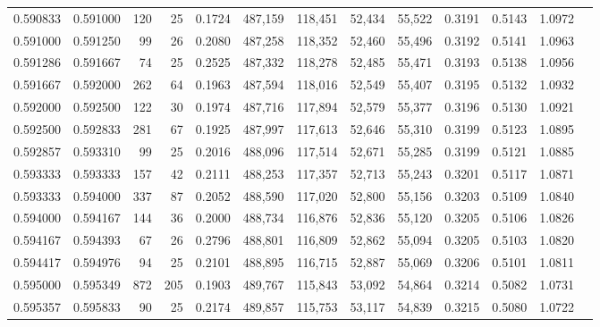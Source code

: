 \begin{tabular}{rrrrrrrrrrrrr}
0.590833 & 0.591000 &   120 &  25 &                                     0.1724 & 487,159 & 118,451 &  52,434 &  55,522 & 0.3191 & 0.5143 & 1.0972 \\
0.591000 & 0.591250 &    99 &  26 &                                     0.2080 & 487,258 & 118,352 &  52,460 &  55,496 & 0.3192 & 0.5141 & 1.0963 \\
0.591286 & 0.591667 &    74 &  25 &                                     0.2525 & 487,332 & 118,278 &  52,485 &  55,471 & 0.3193 & 0.5138 & 1.0956 \\
0.591667 & 0.592000 &   262 &  64 &                                     0.1963 & 487,594 & 118,016 &  52,549 &  55,407 & 0.3195 & 0.5132 & 1.0932 \\
0.592000 & 0.592500 &   122 &  30 &                                     0.1974 & 487,716 & 117,894 &  52,579 &  55,377 & 0.3196 & 0.5130 & 1.0921 \\
0.592500 & 0.592833 &   281 &  67 &                                     0.1925 & 487,997 & 117,613 &  52,646 &  55,310 & 0.3199 & 0.5123 & 1.0895 \\
0.592857 & 0.593310 &    99 &  25 &                                     0.2016 & 488,096 & 117,514 &  52,671 &  55,285 & 0.3199 & 0.5121 & 1.0885 \\
0.593333 & 0.593333 &   157 &  42 &                                     0.2111 & 488,253 & 117,357 &  52,713 &  55,243 & 0.3201 & 0.5117 & 1.0871 \\
0.593333 & 0.594000 &   337 &  87 &                                     0.2052 & 488,590 & 117,020 &  52,800 &  55,156 & 0.3203 & 0.5109 & 1.0840 \\
0.594000 & 0.594167 &   144 &  36 &                                     0.2000 & 488,734 & 116,876 &  52,836 &  55,120 & 0.3205 & 0.5106 & 1.0826 \\
0.594167 & 0.594393 &    67 &  26 &                                     0.2796 & 488,801 & 116,809 &  52,862 &  55,094 & 0.3205 & 0.5103 & 1.0820 \\
0.594417 & 0.594976 &    94 &  25 &                                     0.2101 & 488,895 & 116,715 &  52,887 &  55,069 & 0.3206 & 0.5101 & 1.0811 \\
0.595000 & 0.595349 &   872 & 205 &                                     0.1903 & 489,767 & 115,843 &  53,092 &  54,864 & 0.3214 & 0.5082 & 1.0731 \\
0.595357 & 0.595833 &    90 &  25 &                                     0.2174 & 489,857 & 115,753 &  53,117 &  54,839 & 0.3215 & 0.5080 & 1.0722 \\

\end{tabular}
